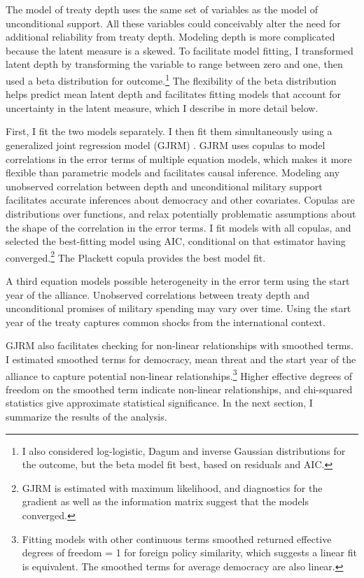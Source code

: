 \documentclass[12pt]{article}
\begin{document}
The model of treaty depth uses the same set of variables as the model of unconditional support. 
All these variables could conceivably alter the need for additional reliability from treaty depth. 
Modeling depth is more complicated because the latent measure is a skewed.
To facilitate model fitting, I transformed latent depth by transforming the variable to range between zero and one, then used a beta distribution for outcome.\footnote{I also considered log-logistic, Dagum and inverse Gaussian distributions for the outcome, but the beta model fit best, based on residuals and AIC.}
The flexibility of the beta distribution helps predict mean latent depth and facilitates fitting models that account for uncertainty in the latent measure, which I describe in more detail below. 


First, I fit the two models separately. 
I then fit them simultaneously using a generalized joint regression model (GJRM) \citep{Braumoelleretal2018}.
GJRM uses copulas to model correlations in the error terms of multiple equation models, which makes it more flexible than parametric models and facilitates causal inference. 
Modeling any unobserved correlation between depth and unconditional military support facilitates accurate inferences about democracy and other covariates. 
Copulas are distributions over functions, and relax potentially problematic assumptions about the shape of the correlation in the error terms. 
I fit models with all copulas, and selected the best-fitting model using AIC, conditional on that estimator having converged.\footnote{GJRM is estimated with maximum likelihood, and diagnostics for the gradient as well as the information matrix suggest that the models converged.} 
The Plackett copula provides the best model fit.


A third equation models possible heterogeneity in the error term using the start year of the alliance. 
Unobserved correlations between treaty depth and unconditional promises of military spending may vary over time. 
Using the start year of the treaty captures common shocks from the international context. 


GJRM also facilitates checking for non-linear relationships with smoothed terms. 
I estimated smoothed terms for democracy, mean threat and the start year of the alliance to capture potential non-linear relationships.\footnote{Fitting models with other continuous terms smoothed returned effective degrees of freedom = 1 for foreign policy similarity, which suggests a linear fit is equivalent. The smoothed terms for average democracy are also linear.}  
Higher effective degrees of freedom on the smoothed term indicate non-linear relationships, and chi-squared statistics give approximate statistical significance. 
In the next section, I summarize the results of the analysis. 
\end{document}

